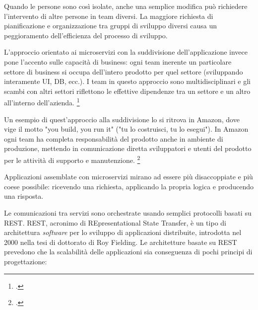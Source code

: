 Quando le persone sono così isolate, anche una semplice modifica può richiedere l'intervento di altre persone in team diversi.
La maggiore richiesta di pianificazione e organizzazione tra gruppi di sviluppo diversi causa un peggioramento dell'efficienza del processo di sviluppo.

L'approccio orientato ai microservizi con la suddivisione dell'applicazione invece pone l'accento sulle capacità di business: ogni team inerente un particolare settore di business si occupa dell'intero prodotto per quel settore (sviluppando interamente UI, DB, ecc.).
I team in questo approccio sono multidisciplinari e gli scambi con altri settori riflettono le effettive dipendenze tra un settore e un altro all'interno dell'azienda.
\footcite{site:fowler-microservices}

Un esempio di quest'approccio alla suddivisione lo si ritrova in Amazon, dove vige il motto "you build, you run it" ("tu lo costruisci, tu lo esegui").
In Amazon ogni team ha completa responsabilità del prodotto anche in ambiente di produzione, mettendo in comunicazione diretta sviluppatori e utenti del prodotto per le attività di supporto e manutenzione.
\footcite{site:amazon-microservices}

Applicazioni assemblate con microservizi mirano ad essere più disaccoppiate e più coese possibile: ricevendo una richiesta, applicando la propria logica e producendo una risposta.

Le comunicazioni tra servizi sono orchestrate usando semplici protocolli basati su REST.
REST, acronimo di REpresentational State Transfer, è un tipo di architettura \emph{software} per lo sviluppo di applicazioni distribuite, introdotta nel 2000 nella tesi di dottorato di Roy Fielding.
Le architetture basate su REST prevedono che la scalabilità delle applicazioni sia conseguenza di pochi principi di progettazione:

